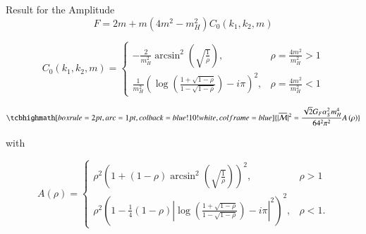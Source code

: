 \documentclass[10pt,t]{beamer}
\begin{document}
\begin{frame}{Result for the Amplitude}
    \small
    \begin{equation*}
        {F = 2m + m\left(4m^2-m_H^2\right)C_0\left(k_1,k_2,m\right)}
    \end{equation*}

    \begin{equation*}
         C_0(k_1,k_2,m) = \begin{cases}
            -\frac{2}{m_H^2}\arcsin^2{\left(\sqrt{\frac{1}{\rho}} \right)}  ,& \rho= \frac{4m^2}{m_H^2} > 1  \\
             \frac{1}{m_H^2}\left(\log\left( \frac{1+\sqrt{1-\rho}}{1-\sqrt{1-\rho}}\right)-i\pi \right)^2,& \rho= \frac{4m^2}{m_H^2} < 1
             \end{cases}
     \end{equation*}

    \vspace{2mm}
    \pause

    
    \begin{equation*}
     \tcbhighmath[boxrule=2pt,arc=1pt,colback=blue!10!white,colframe=blue]{|\overline{\mathcal{M}}|^2 = \frac{\sqrt{2}G_F\alpha_S^2m_H^4}{64^2\pi^2}A\left(\rho\right)}
    \end{equation*}

    with 

    \begin{equation*}
    A\left(\rho\right) = \begin{cases}
    
            \rho^2\left( 1+(1-\rho)\arcsin^2{\left(\sqrt{\frac{1}{\rho}} \right)}\right)^2  ,& \rho > 1  \\
            
            \rho^2\left( 1-\frac{1}{4}(1-\rho)\left| \log\left( \frac{1+\sqrt{1-\rho}}{1-\sqrt{1-\rho}}\right)-i\pi \right|^2\right)^2,& \rho  < 1 .
            \end{cases}
    \end{equation*}
    
\end{frame}
\end{document}
